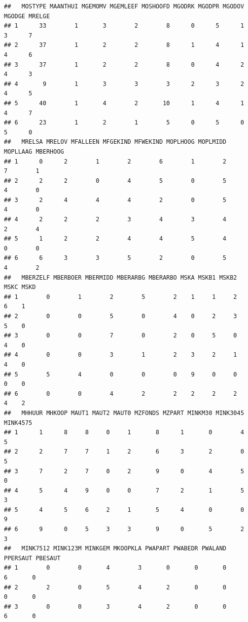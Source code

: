 \documentclass[
  12pt,
]{book}
\theoremstyle{definition}
\theoremstyle{definition}
\theoremstyle{definition}
\theoremstyle{definition}
\theoremstyle{remark}
\begin{document}
\begin{verbatim}
##   MOSTYPE MAANTHUI MGEMOMV MGEMLEEF MOSHOOFD MGODRK MGODPR MGODOV MGODGE MRELGE
## 1      33        1       3        2        8      0      5      1      3      7
## 2      37        1       2        2        8      1      4      1      4      6
## 3      37        1       2        2        8      0      4      2      4      3
## 4       9        1       3        3        3      2      3      2      4      5
## 5      40        1       4        2       10      1      4      1      4      7
## 6      23        1       2        1        5      0      5      0      5      0
##   MRELSA MRELOV MFALLEEN MFGEKIND MFWEKIND MOPLHOOG MOPLMIDD MOPLLAAG MBERHOOG
## 1      0      2        1        2        6        1        2        7        1
## 2      2      2        0        4        5        0        5        4        0
## 3      2      4        4        4        2        0        5        4        0
## 4      2      2        2        3        4        3        4        2        4
## 5      1      2        2        4        4        5        4        0        0
## 6      6      3        3        5        2        0        5        4        2
##   MBERZELF MBERBOER MBERMIDD MBERARBG MBERARBO MSKA MSKB1 MSKB2 MSKC MSKD
## 1        0        1        2        5        2    1     1     2    6    1
## 2        0        0        5        0        4    0     2     3    5    0
## 3        0        0        7        0        2    0     5     0    4    0
## 4        0        0        3        1        2    3     2     1    4    0
## 5        5        4        0        0        0    9     0     0    0    0
## 6        0        0        4        2        2    2     2     2    4    2
##   MHHUUR MHKOOP MAUT1 MAUT2 MAUT0 MZFONDS MZPART MINKM30 MINK3045 MINK4575
## 1      1      8     8     0     1       8      1       0        4        5
## 2      2      7     7     1     2       6      3       2        0        5
## 3      7      2     7     0     2       9      0       4        5        0
## 4      5      4     9     0     0       7      2       1        5        3
## 5      4      5     6     2     1       5      4       0        0        9
## 6      9      0     5     3     3       9      0       5        2        3
##   MINK7512 MINK123M MINKGEM MKOOPKLA PWAPART PWABEDR PWALAND PPERSAUT PBESAUT
## 1        0        0       4        3       0       0       0        6       0
## 2        2        0       5        4       2       0       0        0       0
## 3        0        0       3        4       2       0       0        6       0

\end{verbatim}
\end{document}
